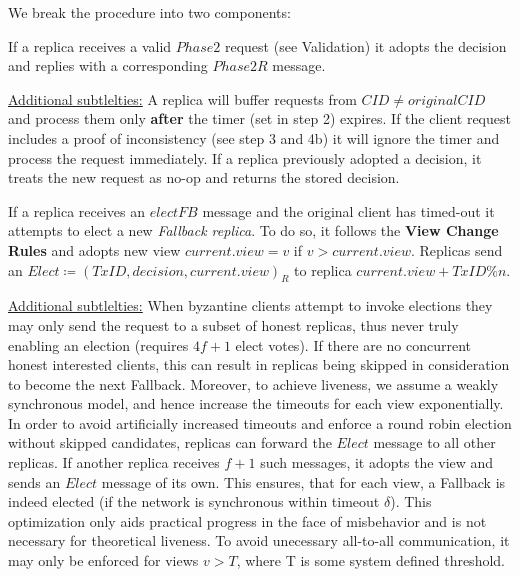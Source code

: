 We break the procedure into two components:

If a replica receives a valid $Phase2$ request (see Validation) it adopts the decision and replies with a corresponding $Phase2R$ message.

\underline{Additional subtlelties:} A replica will buffer requests from $CID \neq originalCID$ and process them only \textbf{after} the timer (set in step 2) expires. If the client request includes a proof of inconsistency (see step 3 and 4b) it will ignore the timer and process the request immediately. If a replica previously adopted a decision, it treats the new request as no-op and returns the stored decision.



If a replica receives an $electFB$ message and the original client has timed-out it attempts to elect a new \textit{Fallback replica}. To do so, it follows the \textbf{View Change Rules} and adopts new view $current.view = v$ if $v > current.view$. 
Replicas send an $Elect \coloneqq (TxID, decision, current.view)_R$ to replica $current.view + TxID \% n$.


\underline{Additional subtlelties:} 
When byzantine clients attempt to invoke elections they may only send the request to a subset of honest replicas, thus never truly enabling an election (requires $4f+1$ elect votes). If there are no concurrent honest interested clients, this can result in replicas being skipped in consideration to become the next Fallback. Moreover, to achieve liveness, we assume a weakly synchronous model, and hence increase the timeouts for each view exponentially.
In order to avoid artificially increased timeouts and enforce a round robin election without skipped candidates, replicas can forward the $Elect$ message to all other replicas. If another replica receives $f+1$ such messages, it adopts the view and sends an $Elect$ message of its own. This ensures, that for each view, a Fallback is indeed elected (if the network is synchronous within timeout $\delta$). This optimization only aids practical progress in the face of misbehavior and is not necessary for theoretical liveness. To avoid unecessary all-to-all communication, it may only be enforced for views $v > T$, where T is some system defined threshold.  



